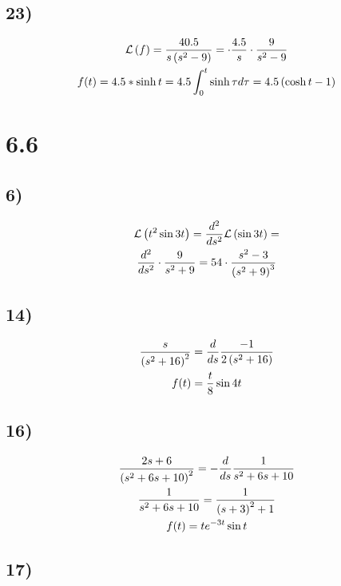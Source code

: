 \newpage


\subsection*{23)}

\begin{gather*}
	\mathcal{L}\left( f \right) =
	\frac{40.5}{s \left( s^2 - 9 \right)} =
	\cdot \frac{4.5}{s} \cdot \frac{9}{s^2 - 9} \\
	f(t) = 4.5 * \sinh{t} =
	4.5 \int_0^t{\sinh{\tau} d\tau} =
	4.5 \left( \cosh{t} - 1 \right)
\end{gather*}


\section*{6.6}


\subsection*{6)}


\begin{gather*}
	\mathcal{L}\left( t^2 \sin{3 t} \right)	=
	\frac{d^2}{ds^2} \mathcal{L}\left( \sin{3 t} \right) = \\
	\frac{d^2}{ds^2} \cdot \frac{9}{s^2 + 9} =
	54 \cdot \frac{s^2 - 3}{\left( s^2 + 9 \right)^3}
\end{gather*}


\subsection*{14)}


\begin{gather*}
	\frac{s}{\left( s^2 + 16 \right)^2} =
	\frac{d}{ds} \frac{-1}{2 \left( s^2 + 16 \right)} \\
	f(t) = \frac{t}{8} \sin{4 t}
\end{gather*}


\subsection*{16)}


\begin{gather*}
	\frac{2 s + 6}{\left( s^2 + 6 s + 10 \right)^2} = - \frac{d}{ds} \frac{1}{s^2 + 6 s + 10} \\
	\frac{1}{s^2 + 6 s + 10} =
	\frac{1}{\left( s + 3 \right)^2 + 1} \\
	f(t) = t e^{-3 t} \sin{t}
\end{gather*}


\subsection*{17)}


